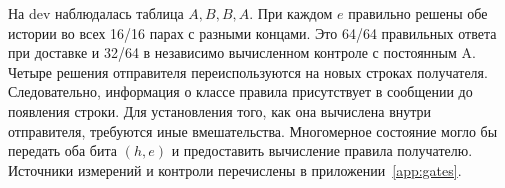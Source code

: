 На dev наблюдалась таблица $A,B,B,A$. При каждом $e$ правильно решены обе истории во всех 16/16 парах с разными концами. Это 64/64 правильных ответа при доставке и 32/64 в независимо вычисленном контроле с постоянным A. Четыре решения отправителя переиспользуются на новых строках получателя. Следовательно, информация о классе правила присутствует в сообщении до появления строки. Для установления того, как она вычислена внутри отправителя, требуются иные вмешательства. Многомерное состояние могло бы передать оба бита $(h,e)$ и предоставить вычисление правила получателю. Источники измерений и контроли перечислены в приложении~\ref{app:gates}.
